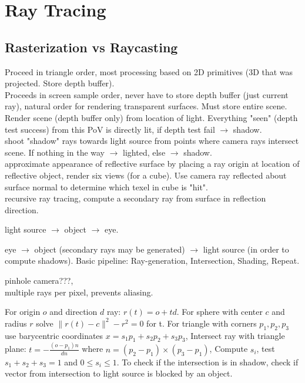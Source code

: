 \section{Ray Tracing}
\subsection*{Rasterization vs Raycasting}
 Proceed in triangle order, most processing based on 2D primitives (3D that was projected. Store depth buffer).\\
 Proceeds in screen sample order, never have to store depth buffer (just current ray), natural order for rendering transparent surfaces. Must store entire scene.\\
 Render scene (depth buffer only) from location of light. Everything "seen" (depth test success) from this PoV is directly lit, if depth test fail $\rightarrow$ shadow.\\
 shoot "shadow" rays towards light source from points where camera rays intersect scene. If nothing in the way $\rightarrow$ lighted, else $\rightarrow$ shadow.\\
 approximate appearance of reflective surface by placing a ray origin at location of reflective object, render six views (for a cube). Use camera ray reflected about surface normal to determine which texel in cube is "hit".\\
 recursive ray tracing, compute a secondary ray from surface in reflection direction.

 light source $\to$ object $\to$ eye.

 eye $\to$ object (secondary rays may be generated) $\to$ light source (in order to compute shadows). Basic pipeline: Ray-generation, Intersection, Shading, Repeat.

 pinhole camera???,\\
 multiple rays per pixel, prevents aliasing.

 For origin $o$ and direction $d$ ray: $r(t) = o + td$. For sphere with center $c$ and radius $r$ solve $\|r(t) - c\|^2 - r^2 = 0$ for t. For triangle with corners $p_1, p_2, p_3$ use barycentric coordinates $x = s_1p_1 + s_2p_2 + s_3p_3$, Intersect ray with triangle plane: $t = -\frac{(o-p_1)n}{dn}$ where $n = (p_2 - p_1) \times (p_3 - p_1)$, Compute $s_i$, test $s_1 + s_2 + s_3 = 1$ and $0 \leq s_i \leq 1$. To check if the intersection is in shadow, check if vector from intersection to light source is blocked by an object.

